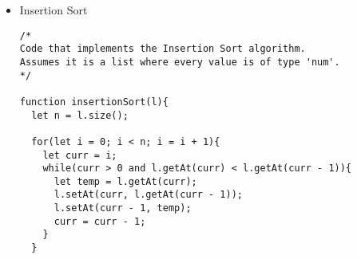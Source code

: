 \begin{itemize}
\begin{lstlisting}
  method front(){
    if(self.left == nil){
      return "The queue is empty.";
    }else{
      return self.left;
    }
  }

  method back(){
    if(self.right == nil){
      return "The queue is empty.";
    }else{
      return self.right;
    }
  }

  method push(value){
    if(self.length == 0){
      let newNode = Node(value);
      self.left = newNode;
      self.right = self.left;
    }else{
      let newNode = Node(value);
      self.right.next = newNode;
      self.right = newNode;
    }

    self.length = self.length + 1;

    return;
  }

  method pop(){
    if(self.length == 0){ // Queue is empty.
      return "The queue is empty.";
    }elif(self.length == 1){ // Queue is not empty and has only one element.
      let poppedValue = self.left.value;

      self.left = nil;
      self.right = nil;

      self.length = self.length - 1;

      return poppedValue;
    }else{ // Queue is not empty and has more than one element.
      let poppedValue = self.left.value;

      self.left = self.left.next;
      self.length = self.length - 1;

      return poppedValue;
    }
  }

  method str(){
    let queueAsString = "front -> ";
    let curr = self.left;
    while(curr != nil){
      if(curr != nil and curr.next != nil){
        queueAsString = queueAsString + (curr.value + " -> ");
      }else{
        queueAsString = queueAsString + curr.value;
      }
      curr = curr.next;
    }
    queueAsString = queueAsString + " <- back";

    return queueAsString;
  }
}
        \end{lstlisting}


    \item Insertion Sort
        \begin{lstlisting}
/*
Code that implements the Insertion Sort algorithm.
Assumes it is a list where every value is of type 'num'.
*/

function insertionSort(l){
  let n = l.size();

  for(let i = 0; i < n; i = i + 1){
    let curr = i;
    while(curr > 0 and l.getAt(curr) < l.getAt(curr - 1)){
      let temp = l.getAt(curr);
      l.setAt(curr, l.getAt(curr - 1));
      l.setAt(curr - 1, temp);
      curr = curr - 1;
    }
  }


\end{lstlisting}
\end{itemize}
